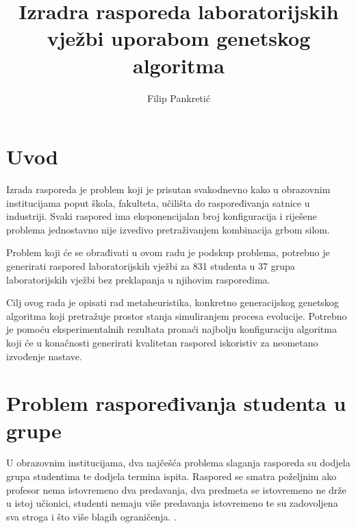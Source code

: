 \documentclass[times, utf8, zavrsni]{fer}
\begin{document}

\title{Izradra rasporeda laboratorijskih vježbi uporabom genetskog algoritma}

\author{Filip Pankretić}

\maketitle

\izvornik


\tableofcontents
\listoffigures

\chapter{Uvod}

Izrada rasporeda je problem koji je prisutan svakodnevno kako u obrazovnim institucijama poput škola, fakulteta, učilišta do raspoređivanja satnice  u industriji. Svaki raspored ima eksponencijalan broj konfiguracija i riješene problema jednostavno nije izvedivo pretraživanjem kombinacija grbom silom.

Problem koji će se obrađivati u ovom radu je podskup problema, potrebno je generirati raspored laboratorijskih vježbi za 831 studenta u 37 grupa laboratorijskih vježbi bez preklapanja u njihovim rasporedima.

Cilj ovog rada je opisati rad metaheuristika, konkretno generacijskog genetskog algoritma koji pretražuje prostor stanja simuliranjem procesa evolucije. Potrebno je pomoću eksperimentalnih rezultata pronaći najbolju konfiguraciju algoritma koji će u konačnosti generirati kvalitetan raspored iskoristiv za neometano izvođenje nastave.

\chapter{Problem raspoređivanja studenta u grupe}

U obrazovnim institucijama, dva najčešća problema slaganja rasporeda su dodjela grupa studentima te dodjela termina ispita. Raspored se smatra poželjnim ako profesor nema istovremeno dva predavanja, dva predmeta se istovremeno ne drže u istoj učionici, studenti nemaju više predavanja istovremeno te su zadovoljena sva stroga i što više blagih ograničenja. \citep{ganguli2017study}.
\end{document}
